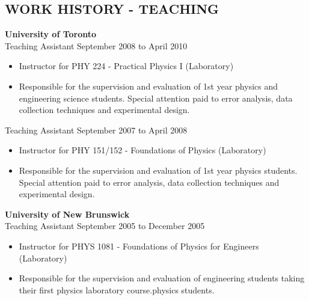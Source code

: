 \documentclass[margin]{res}
\begin{document}
\begin{resume}
\section{WORK HISTORY - TEACHING}
{\bf University of Toronto}\\
Teaching Assistant \hfill September 2008 to April 2010
\begin{itemize} \itemsep -2pt
\item Instructor for PHY 224 - Practical Physics I (Laboratory)
\item Responsible for the supervision and evaluation of 1st year physics and engineering science students. Special attention paid to error analysis, data collection techniques and experimental design.
\end{itemize}

Teaching Assistant \hfill September 2007 to April 2008
\begin{itemize} \itemsep -2pt
\item Instructor for PHY 151/152 - Foundations of Physics (Laboratory)
\item Responsible for the supervision and evaluation of 1st year physics students. Special attention paid to error analysis, data collection techniques and experimental design.
\end{itemize}

{\bf University of New Brunswick}\\
Teaching Assistant \hfill September 2005 to December 2005
\begin{itemize} \itemsep -2pt
\item Instructor for PHYS 1081 - Foundations of Physics for Engineers (Laboratory)
\item Responsible for the supervision and evaluation of engineering students taking their first physics laboratory course.physics students.
\end{itemize}


\end{resume}
\end{document}
